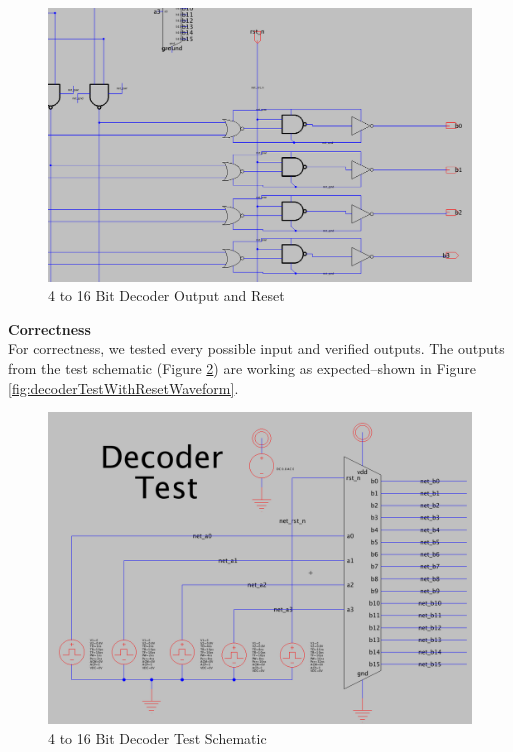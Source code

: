 \documentclass[a4paper]{article}
\begin{document}
\begin{figure}[H]
	\centering
	\includegraphics[scale=0.3]{decoderSchematicReset}
	\caption{4 to 16 Bit Decoder Output and Reset}
	\label{fig:decoderSchematicReset}
\end{figure}

\textbf{Correctness}\\
For correctness, we tested every possible input and verified outputs. The outputs from the test schematic (Figure \ref{fig:decoderTestWithResetSchematic}) are working as expected--shown in Figure \ref{fig:decoderTestWithResetWaveform}. 

\begin{figure}[H]
	\centering
	\includegraphics[scale=0.3]{decoderTestWithResetSchematic}
	\caption{4 to 16 Bit Decoder Test Schematic}
	\label{fig:decoderTestWithResetSchematic}
\end{figure}
\end{document}
